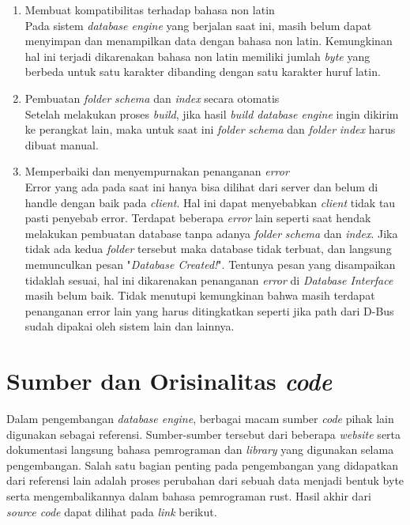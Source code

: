 \begin{enumerate}
	\item Membuat kompatibilitas terhadap bahasa non latin \\
	Pada sistem \emph{database engine} yang berjalan saat ini, masih belum dapat menyimpan dan menampilkan data dengan bahasa non latin. Kemungkinan hal ini terjadi
	dikarenakan bahasa non latin memiliki jumlah \emph{byte} yang berbeda untuk satu karakter dibanding dengan satu karakter huruf latin.

	\item Pembuatan \emph{folder} \emph{schema} dan \emph{index} secara otomatis  \\
	Setelah melakukan proses \emph{build}, jika hasil \emph{build database engine} ingin dikirim ke perangkat lain, maka untuk saat ini \emph{folder} \emph{schema} dan \emph{folder}
	\emph{index} harus dibuat manual. 

	\item Memperbaiki dan menyempurnakan penanganan \emph{error} \\
  	Error yang ada pada saat ini hanya bisa dilihat dari server dan belum di handle dengan baik pada \emph{client}. Hal ini dapat menyebabkan \emph{client} tidak tau pasti penyebab error.
	Terdapat beberapa \emph{error} lain seperti saat hendak melakukan pembuatan database tanpa adanya \emph{folder} \emph{schema} dan \emph{index}. Jika tidak ada kedua \emph{folder} tersebut 
	maka database tidak terbuat, dan langsung memunculkan pesan "\emph{Database Created!}". Tentunya pesan yang disampaikan
	tidaklah sesuai, hal ini dikarenakan penanganan \emph{error} di \emph{Database Interface} masih belum baik. Tidak menutupi kemungkinan bahwa masih terdapat
	penanganan error lain yang harus ditingkatkan seperti jika path dari D-Bus sudah dipakai oleh sistem lain dan lainnya.

\end{enumerate}

\section{Sumber dan Orisinalitas \emph{code}}
Dalam pengembangan \emph{database engine}, berbagai macam sumber \emph{code} pihak lain digunakan sebagai referensi. Sumber-sumber tersebut dari beberapa \emph{website} 
serta dokumentasi langsung bahasa pemrograman dan \emph{library} yang digunakan selama pengembangan. Salah satu bagian penting pada pengembangan yang didapatkan dari 
referensi lain adalah proses perubahan dari sebuah data menjadi bentuk byte serta mengembalikannya dalam bahasa pemrograman rust. Hasil akhir dari \emph{source code} dapat dilihat pada \emph{link} berikut.

